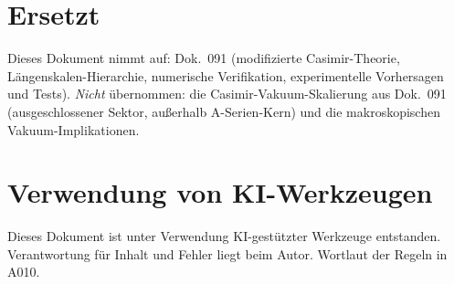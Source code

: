 \section{Ersetzt}

Dieses Dokument nimmt auf: Dok.~091 (modifizierte Casimir-Theorie, Längenskalen-Hierarchie,
numerische Verifikation, experimentelle Vorhersagen und Tests). \emph{Nicht}
übernommen: die Casimir-Vakuum-Skalierung aus Dok.~091 (ausgeschlossener Sektor,
außerhalb A-Serien-Kern) und die makroskopischen Vakuum-Implikationen.

\section{Verwendung von KI-Werkzeugen}

Dieses Dokument ist unter Verwendung KI-gestützter Werkzeuge entstanden. Verantwortung
für Inhalt und Fehler liegt beim Autor. Wortlaut der Regeln in A010.
